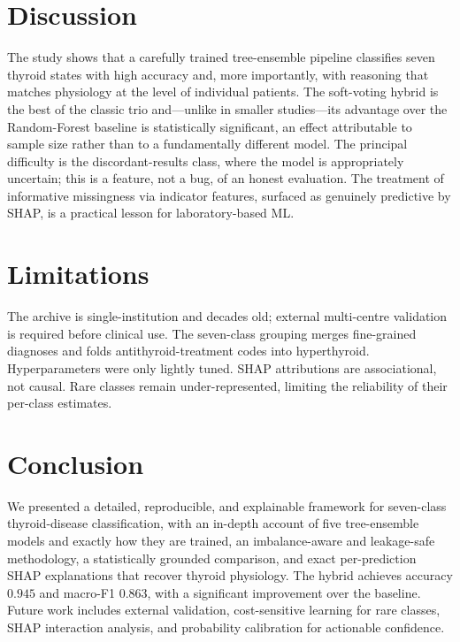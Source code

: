 \documentclass[conference]{IEEEtran}
\begin{document}
\section{Discussion}
The study shows that a carefully trained tree-ensemble pipeline classifies seven
thyroid states with high accuracy and, more importantly, with reasoning that
matches physiology at the level of individual patients. The soft-voting hybrid is
the best of the classic trio and---unlike in smaller studies---its advantage over
the Random-Forest baseline is statistically significant, an effect attributable to
sample size rather than to a fundamentally different model. The principal
difficulty is the discordant-results class, where the model is appropriately
uncertain; this is a feature, not a bug, of an honest evaluation. The treatment of
informative missingness via indicator features, surfaced as genuinely predictive by
SHAP, is a practical lesson for laboratory-based ML.

\section{Limitations}
The archive is single-institution and decades old; external multi-centre
validation is required before clinical use. The seven-class grouping merges
fine-grained diagnoses and folds antithyroid-treatment codes into hyperthyroid.
Hyperparameters were only lightly tuned. SHAP attributions are associational, not
causal. Rare classes remain under-represented, limiting the reliability of their
per-class estimates.

\section{Conclusion}
We presented a detailed, reproducible, and explainable framework for seven-class
thyroid-disease classification, with an in-depth account of five tree-ensemble
models and exactly how they are trained, an imbalance-aware and leakage-safe
methodology, a statistically grounded comparison, and exact per-prediction SHAP
explanations that recover thyroid physiology. The hybrid achieves accuracy $0.945$
and macro-F1 $0.863$, with a significant improvement over the baseline. Future work
includes external validation, cost-sensitive learning for rare classes, SHAP
interaction analysis, and probability calibration for actionable confidence.
\end{document}
